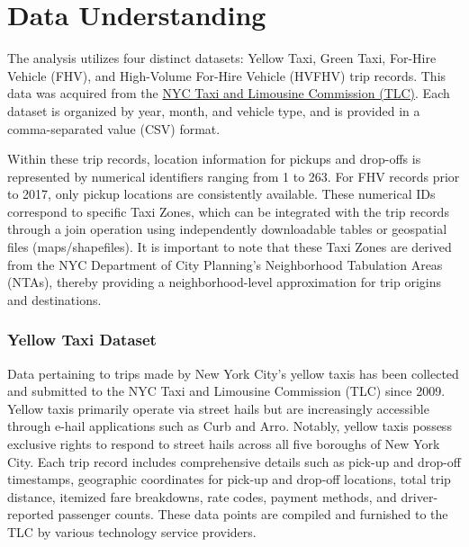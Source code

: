 \documentclass[conference]{IEEEtran}
\begin{document}
\section{Data Understanding}
The analysis utilizes four distinct datasets: Yellow Taxi, Green Taxi, For-Hire Vehicle (FHV), and High-Volume
For-Hire Vehicle (HVFHV) trip records. This data was acquired from the
\href{https://www.nyc.gov/site/tlc/about/tlc-trip-record-data.page}{NYC Taxi and Limousine Commission (TLC)}.
Each dataset is organized by year, month, and vehicle type, and is provided in a comma-separated value (CSV) format.

Within these trip records, location information for pickups and drop-offs is represented by numerical identifiers
ranging from 1 to 263. For FHV records prior to 2017, only pickup locations are consistently available. These numerical
IDs correspond to specific Taxi Zones, which can be integrated with the trip records through a join operation using
independently downloadable tables or geospatial files (maps/shapefiles). It is important to note that these Taxi Zones
are derived from the NYC Department of City Planning's Neighborhood Tabulation Areas (NTAs), thereby providing a
neighborhood-level approximation for trip origins and destinations.

\subsubsection*{Yellow Taxi Dataset}
Data pertaining to trips made by New York City's yellow taxis has been collected and submitted to the NYC Taxi and
Limousine Commission (TLC) since 2009. Yellow taxis primarily operate via street hails but are increasingly accessible
through e-hail applications such as Curb and Arro. Notably, yellow taxis possess exclusive rights to respond to street
hails across all five boroughs of New York City.
Each trip record includes comprehensive details such as pick-up and drop-off timestamps, geographic coordinates for
pick-up and drop-off locations, total trip distance, itemized fare breakdowns, rate codes, payment methods, and
driver-reported passenger counts. These data points are compiled and furnished to the TLC by various technology
service providers.
\end{document}
